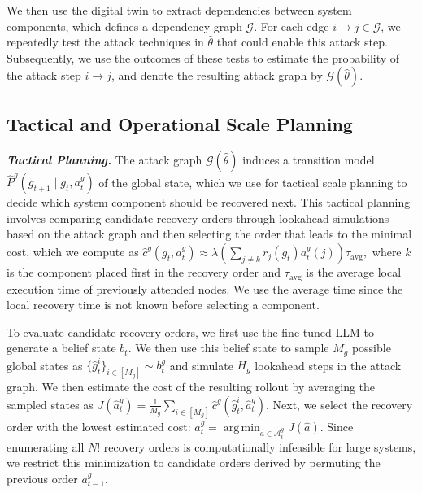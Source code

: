 \documentclass[runningheads,10pt]{llncs}
\DeclareMathOperator*{\argmin}{arg\,min}
\begin{document}
We then use the digital twin to extract dependencies between system components, which defines a dependency graph $\mathcal{G}$. For each edge $i\rightarrow j\in \mathcal{G}$, we repeatedly test the attack techniques in $\hat{\theta}$ that could enable this attack step. Subsequently, we use the outcomes of these tests to estimate the probability of the attack step $i\rightarrow j$, and denote the resulting attack graph by $\mathcal{G}(\hat{\theta})$.

\subsection{Tactical and Operational Scale Planning}
\noindent\textit{\textbf{Tactical Planning.}} The attack graph $\mathcal{G}(\hat{\theta})$ induces a transition model $\hat{P}^g(g_{t+1} \mid g_t, a^g_t)$ of the global state, which we use for tactical scale planning to decide which system component should be recovered next. This tactical planning involves comparing candidate recovery orders through lookahead simulations based on the attack graph and then selecting the order that leads to the minimal cost, which we compute as 
$\hat{c}^g(g_t, a^g_t) \approx \lambda \left(\sum_{j\neq k}r_j(g_t)a^g_t(j)\right)\tau_{\text{avg}},$
where $k$ is the component placed first in the recovery order and $\tau_\text{avg}$ is the average local execution time of previously attended nodes. We use the average time since the local recovery time is not known before selecting a component.

To evaluate candidate recovery orders, we first use the fine-tuned LLM to generate a belief state $b_t$. We then use this belief state to sample $M_g$ possible global states as $\{\hat{g}^i_t\}_{i \in [M_g]} \sim b^g_t$ and simulate $H_g$ lookahead steps in the attack graph. We then estimate the cost of the resulting rollout by averaging the sampled states as $J(\hat{a}^g_t) = \frac{1}{M_g}\sum_{i \in [M_g]}\hat{c}^g(\hat{g}^i_t, \hat{a}^g_t)$.
Next, we select the recovery order with the lowest estimated cost:
$
a^g_t = \argmin_{\hat{a} \in \mathcal{A}_t^g}J(\hat{a}).
$
Since enumerating all $N!$ recovery orders is computationally infeasible for large systems, we restrict this minimization to candidate orders derived by permuting the previous order $a^g_{t-1}$.
\end{document}
